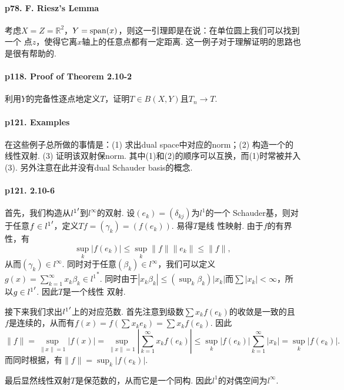   \paragraph{p78. F. Riesz's Lemma}
    考虑$X=Z=\mathbb{R}^2$，$Y=\operatorname{span}(x)$，则这一引理即是在说：在单位圆上我们可以找到一个
    点$z$，使得它离$x$轴上的任意点都有一定距离. 这一例子对于理解证明的思路也是很有帮助的. 

  \paragraph{p118. Proof of Theorem 2.10-2}
    利用$Y$的完备性逐点地定义$T$，证明$T\in B(X,Y)$且$T_n\to T$. 

  \paragraph{p121. Examples}
    在这些例子总所做的事情是：(1) 求出dual space中对应的norm；(2) 构造一个的线性双射. (3)
    证明该双射保norm. 其中(1)和(2)的顺序可以互换，而(1)时常被并入(3). 
    另外注意在此并没有dual Schauder basis的概念. 

  \paragraph{p121. 2.10-6}
    首先，我们构造从${l^1}^\prime$到$l^\infty$的双射. 设$(e_k)=(\delta_{kj})$为$l^1$的一个
    Schauder基，则对于任意$f\in {l^1}^\prime$，定义$Tf=(\gamma_k)=(f(e_k))$. 易得$T$是线
    性映射. 由于$f$的有界性，有
    \begin{equation}
      \label{eq:121-1}
      \sup_k|f(e_k)|\le \sup_k\|f\|\|e_k\|\le \|f\|,
    \end{equation}
    从而$(\gamma_k)\in l^\infty$. 同时对于任意$(\beta_k)\in l^\infty$，我们可以定义
    $g(x)=\sum_{k=1}^\infty x_k\beta_k \in {l^1}^*$. 同时由于$|x_k\beta_k| \le 
    (\sup_k\beta_k)|x_k|$而$\sum|x_k|<\infty$，所以$g\in{l^1}^\prime$. 因此$T$是一个线性
    双射. \par
    接下来我们求出${l^1}^\prime$上的对应范数. 首先注意到级数$\sum x_kf(e_k)$的收敛是一致的且
    $f$是连续的，从而有$f(x)=f(\sum x_ke_k)=\sum x_kf(e_k)$. 因此
    \[
      \|f\|=\sup_{\|x\|=1}|f(x)|=
      \sup_{\|x\|=1}\left|\sum_{k=1}^\infty x_kf(e_k)\right|\le
      \sup_k|f(e_k)|\sum_{k=1}^\infty|x_k|=\sup_k|f(e_k)|.
    \]
    而同时根据，有$\|f\|=\sup_k|f(e_k)|$.\par
    最后显然线性双射$T$是保范数的，从而它是一个同构. 因此$l^1$的对偶空间为$l^\infty$.

